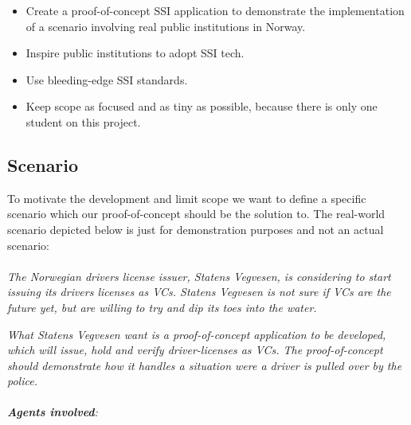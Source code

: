 \begin{itemize}
\tightlist
\item
  Create a proof-of-concept SSI application to demonstrate the
  implementation of a scenario involving real public institutions in
  Norway.
\item
  Inspire public institutions to adopt SSI tech.
\item
  Use bleeding-edge SSI standards.
\item
  Keep scope as focused and as tiny as possible, because there is only one
  student on this project.
\end{itemize}




\pagebreak



\hypertarget{scenario}{%
\subsection{Scenario}\label{scenario}}

To motivate the development and limit scope we want to define a specific
scenario which our proof-of-concept should be the solution to. The
real-world scenario depicted below is just for demonstration purposes
and not an actual scenario:

\paragraph{}

\emph{The Norwegian drivers license issuer, Statens Vegvesen, is
considering to start issuing its drivers licenses as VCs. Statens
Vegvesen is not sure if VCs are the future yet, but are willing to try
and dip its toes into the water.}

\emph{What Statens Vegvesen want is a proof-of-concept application to be
developed, which will issue, hold and verify driver-licenses as VCs. The
proof-of-concept should demonstrate how it handles a situation were a
driver is pulled over by the police.}

\paragraph{}

\emph{\textbf{Agents involved}:}

